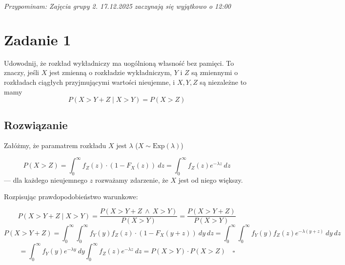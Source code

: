 \textit{Przypominam: Zajęcia grupy 2. 17.12.2025 zaczynają się wyjątkowo o 12:00}

\section{Zadanie 1}
Udowodnij, że rozkład wykładniczy ma uogólnioną własność
bez pamięci. To znaczy, jeśli \(X\) jest zmienną o rozkładzie wykładniczym,
\(Y\) i \(Z\) są zmiennymi o rozkładach ciągłych przyjmującymi
wartości nieujemne, i \(X, Y, Z\) są niezależne to mamy
\[ P(X>Y+Z \mid X>Y) = P(X>Z) \]

\subsection*{Rozwiązanie}

Załóżmy, że paramatrem rozkładu \(X\) jest \(\lambda\)
(\( X \sim \text{Exp}(\lambda)\))

\[
	P(X>Z) = \int_0^{\infty} f_Z(z) \cdot (1-F_X(z))~dz
	= \int_0^{\infty} f_Z(z) e^{-\lambda z}~dz
\]
--- dla każdego nieujemnego \(z\) rozważamy zdarzenie, że \(X\) jest od niego
większy.

Rozpisując prawdopodobieństwo warunkowe:

\[
	P(X>Y+Z \mid X>Y) = \frac{P(X>Y+Z~\land~X>Y)}{P(X>Y)}
	= \frac{P(X>Y+Z)}{P(X>Y)}
\]
\[
	P(X > Y+Z)
	= \int_0^{\infty} \int_0^{\infty} f_Y(y) f_Z(z)
	\cdot (1-F_X(y+z))~dy~dz
	= \int_0^{\infty} \int_0^{\infty} f_Y(y) f_Z(z)
	e^{-\lambda(y+z)}~dy~dz
\]
\[
	= \int_0^{\infty} f_Y(y) e^{-\lambda y}~dy
	\int_0^{\infty} f_Z(z) e^{-\lambda z}~dz
	= P(X>Y) \cdot P(X>Z)
	\quad \square
\]
